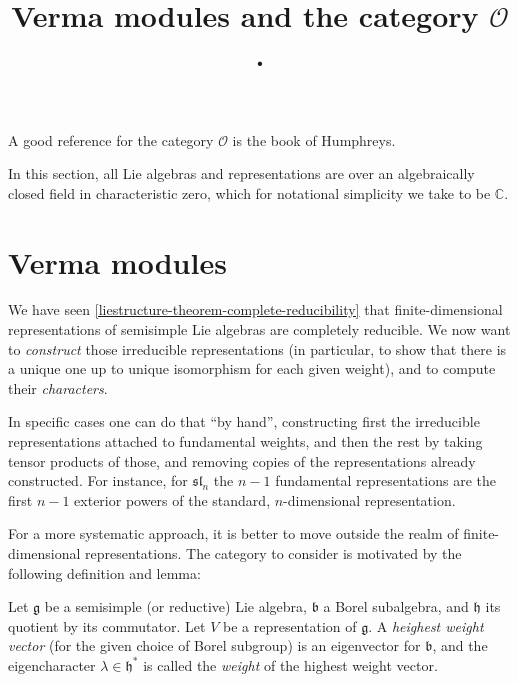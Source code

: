 

%


\title{Verma modules and the category $\mathcal O$.}


\maketitle

\label{section-phantom}


\tableofcontents

A good reference for the category $\mathcal O$ is the book \cite{Humphreys-O} of Humphreys.


In this section, all Lie algebras and representations are over an algebraically closed field in characteristic zero, which for notational simplicity we take to be $\mathbb C$.


\section{Verma modules}
\label{section-Verma-modules}
We have seen \ref{liestructure-theorem-complete-reducibility} that finite-dimensional representations of semisimple Lie algebras are completely reducible. We now want to \emph{construct} those irreducible representations (in particular, to show that there is a unique one up to unique isomorphism for each given weight), and to compute their \emph{characters}.

In specific cases one can do that ``by hand'', constructing first the irreducible representations attached to fundamental weights, and then the rest by taking tensor products of those, and removing copies of the representations already constructed. For instance, for $\mathfrak{sl}_n$ the $n-1$ fundamental representations are the first $n-1$ exterior powers of the standard, $n$-dimensional representation.

For a more systematic approach, it is better to move outside the realm of finite-dimensional representations. The category to consider is motivated by the following definition and lemma:
\begin{definition}
 \label{definition-highest-weight}
 Let $\mathfrak g$ be a semisimple (or reductive) Lie algebra, $\mathfrak b$ a Borel subalgebra, and $\mathfrak h$ its quotient by its commutator. Let $V$ be a representation of $\mathfrak g$. A {\it heighest weight vector} (for the given choice of Borel subgroup) is an eigenvector for $\mathfrak b$, and the eigencharacter $\lambda\in\mathfrak h^*$ is called the {\it weight} of the highest weight vector.
\end{definition}


